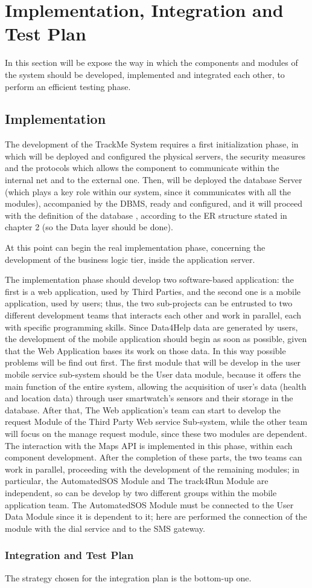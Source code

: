 \chapter{Implementation, Integration and Test Plan}
In this section will be expose the way in which the components and modules of the system should be developed, implemented and integrated each other, to perform an efficient testing phase.
\section{Implementation}

The development of the TrackMe System requires a first initialization phase, in which will be deployed and configured the physical servers, the security measures and the protocols which allows the component to communicate within the internal net and to the external one.
Then, will be deployed the database Server (which plays a key role within our system, since it communicates with all the modules),  accompanied by the DBMS, ready and configured, and it will proceed with the definition of the database , according to the ER structure stated in chapter 2 (so the Data layer should be done). 

At this point can begin the real implementation phase, concerning the development of the business logic tier, inside the application server.

The implementation phase should develop two software-based application:
the first is a web application, used by Third Parties, and the second one is a mobile application, used by users; thus, the two sub-projects can be entrusted to two different development teams that interacts each other and work in parallel, each with specific programming skills.
Since Data4Help data are generated by users, the development of the mobile application should begin as soon as possible, given that the Web Application bases its work on those data. In this way possible problems will be find out first.
The first module that will be develop in the user mobile service sub-system should be the User data module, because it offers the main function of the entire system, allowing the acquisition of user's data (health and location data) through user smartwatch's sensors and their storage in the database.
After that, The Web application's team can start to develop the request Module of the Third Party Web service Sub-system, while the other team will focus on  the manage request module, since these two modules are dependent.
The interaction with the Maps API is implemented in this phase, within each component development.
After the completion of these parts, the two teams can work in parallel, proceeding with the development of the remaining modules; in particular, the AutomatedSOS Module and The track4Run Module are independent, so can be develop by two different groups within the mobile application team.
The AutomatedSOS Module must be connected to the User Data Module since it is dependent to it; here are performed the connection of the module with the dial service and to the SMS gateway.


\subsection{Integration and Test Plan}
The strategy chosen for the integration plan is the bottom-up one.